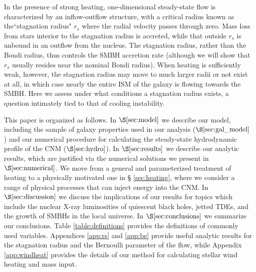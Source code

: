 \documentclass[usenatbib,fleqn]{mn2e}
\newcommand{\rs}{r_s}
\begin{document}
In the presence of strong heating, one-dimensional steady-state flow
is characterized by an inflow-outflow structure, with a critical
radius known as the``stagnation radius" $\rs$ where the radial
velocity passes through zero.  Mass loss from stars interior to the
stagnation radius is accreted, while that outside $\rs$ is unbound in
an outflow from the nucleus.  The stagnation radius, rather than the
Bondi radius, thus controls the SMBH accretion rate (although we will
show that $\rs$ usually resides near the nominal Bondi
radius).  When heating is sufficiently weak, however, the stagnation
radius may move to much larger radii or not exist at all, in which
case nearly the entire ISM of the galaxy is flowing towards the SMBH.
Here we assess under what conditions a stagnation
radius exists, a question intimately tied to that of cooling
instability.


This paper is organized as follows.  In $\S\ref{sec:model}$ we
describe our model, including the sample of galaxy properties used in
our analysis ($\S\ref{sec:gal_model}$) and our numerical procedure for
calculating the steady-state hydrodynamic profile of the CNM
($\S\ref{sec:hydro}$).  In $\S\ref{sec:results}$ we describe our
analytic results, which are justified via the numerical solutions we
present in $\S\ref{sec:numerical}$.  We move from a general and
parameterized treatment of heating to a physically motivated one in \S
\ref{sec:heating}, where we consider a range of physical processes
that can inject energy into the CNM.  In $\S\ref{sec:discussion}$ we
discuss the implications of our results for topics which include the
nuclear X-ray luminosities of quiescent black holes, jetted TDEs, and
the growth of SMBHs in the local universe.  In
$\S\ref{sec:conclusions}$ we summarize our conclusions.  Table
\ref{table:definitions} provides the definitions of commonly used
variables.  Appendices \ref{app:rs} and \ref{app:be} provide useful
analytic results for the stagnation radius and the Bernoulli parameter
of the flow, while Appendix \ref{app:windheat} provides the details of
our method for calculating stellar wind heating and mass input.
\end{document}

